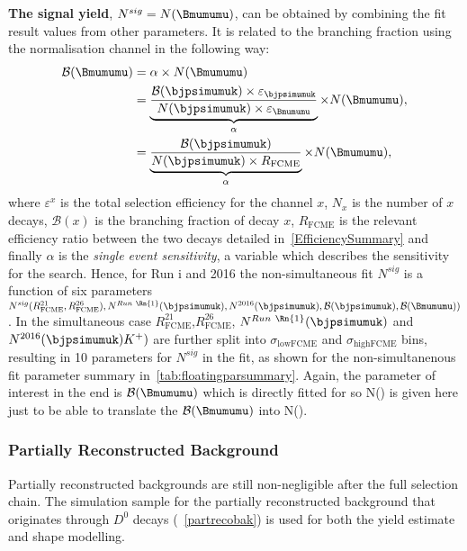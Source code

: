 \textbf{The signal yield}, $N^{sig}=N(\Bmumumu)$, can be obtained by combining the fit result values from other parameters. It is related to the branching fraction using the normalisation channel in the following way:
\begin{equation}
\begin{split}
\mathcal{B}(\Bmumumu)&=\alpha \times N(\Bmumumu)\\
&=\underbrace{\frac{\mathcal{B}(\bjpsimumuk) \times \varepsilon_{\bjpsimumuk}}{N(\bjpsimumuk) \times \varepsilon_{\Bmumumu}}}_{\text{$\alpha$}} \times N(\Bmumumu),\\
&=\underbrace{\frac{\mathcal{B}(\bjpsimumuk)}{N(\bjpsimumuk) \times  R_{\mathrm{FCME}}}}_{\text{$\alpha$}} \times N(\Bmumumu),\\
\end{split}
\label{eq:sigeq}
\end{equation}
where  $\varepsilon^{x}$ is the total selection efficiency for the channel $x$, $N_{x}$ is the number of $x$ decays, $\mathcal{B}(x)$ is the branching fraction of decay $x$, $R_{\mathrm{FCME}}$ is the relevant efficiency ratio between the two decays detailed in~\autoref{EfficiencySummary} and finally $\alpha$ is the \textit{single event sensitivity}, a variable which describes the sensitivity for the search. Hence, for Run \Rn{1} and 2016 the non-simultaneous fit $N^{sig}$ is a function of six parameters $N^{sig}(R^{21}_{\mathrm{FCME}},R^{26}_{\mathrm{FCME}}),N^{Run\ \Rn{1}}(\bjpsimumuk),N^{2016}(\bjpsimumuk), \mathcal{B}(\bjpsimumuk),\mathcal{B}(\Bmumumu))$. In the simultaneous case $R^{21}_{\mathrm{FCME}}$,$R^{26}_{\mathrm{FCME}}$, $N^{Run\ \Rn{1}}(\bjpsimumuk)$ and $N^{2016}(\bjpsimumuk) K^{+})$ are further split into $\sigma_{\mathrm{lowFCME}}$ and $\sigma_{\mathrm{highFCME}}$ bins, resulting in 10 parameters for $N^{sig}$ in the fit, as shown for the non-simultanenous fit parameter summary in~\autoref{tab:floatingparsummary}. Again, the parameter of interest in the end is $\mathcal{B}(\Bmumumu)$ which is directly fitted for so N(\Bmumumu) is given here just to be able to translate the $\mathcal{B}(\Bmumumu)$ into N(\Bmumumu).



\subsubsection{Partially Reconstructed Background}
\label{finfitpr}
Partially reconstructed backgrounds are still non-negligible after the full selection chain. 
 The simulation sample for the partially reconstructed background that originates through $D^{0}$ decays (~\autoref{partrecobak}) is used for both the yield estimate and shape modelling.


